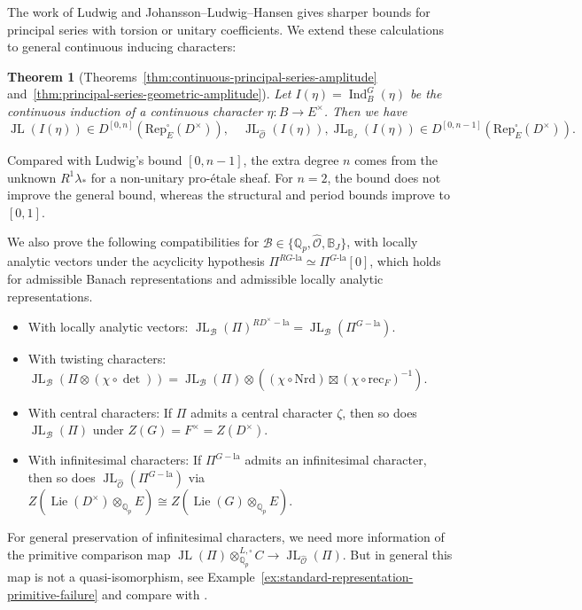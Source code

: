 \documentclass[11pt]{article}
\newtheorem{theorem}{Theorem}[section]
\theoremstyle{definition}
\newcommand{\la}{\mathrm{la}}
\newcommand{\Ind}{\operatorname{Ind}}
\newcommand{\JL}{\operatorname{JL}}
\newcommand{\Lie}{\operatorname{Lie}}
\begin{document}
The work of Ludwig \cite{Ludwig} and Johansson--Ludwig--Hansen
\cite{JLH} gives sharper bounds for principal series with
torsion or unitary coefficients.  We extend these calculations
to general continuous inducing characters:

\begin{theorem}[Theorems~\ref{thm:continuous-principal-series-amplitude}
and~\ref{thm:principal-series-geometric-amplitude}]
  Let $I(\eta)=\Ind_B^G(\eta)$ be the continuous induction of a continuous character $\eta\colon B\to E^\times$. Then we have 
  \[\JL(I(\eta))\in D^{[0, n]}(\mathrm{Rep}_E^{\square}(D^\times)), \quad
  \JL_{\widehat{\mathscr O}}(I(\eta)),
  \JL_{\mathbb B_J}(I(\eta))
  \in D^{[0,n-1]}(\mathrm{Rep}_E^\square(D^\times)).
  \]
\end{theorem}
Compared with Ludwig's bound $[0, n-1]$, the extra degree $n$ comes from the unknown $R^1\lambda_*$ for a non-unitary pro-\'etale sheaf. 
For \(n=2\), the bound does not improve the general bound,
whereas the structural and period bounds improve to \([0,1]\).

We also prove the following compatibilities for $\mathscr{B}\in\{\mathbb{Q}_p, \widehat{\mathscr O}, \mathbb{B}_J\}$, with locally analytic vectors under
the acyclicity hypothesis \(\Pi^{RG\text{-}\la}\simeq\Pi^{G\text{-}\la}[0]\), which holds for admissible
Banach representations and admissible locally analytic representations.
\begin{itemize}
      \item{With locally analytic vectors:}  $\JL_{\mathscr{B}}(\Pi)^{RD^\times-\mathrm{la}}=\JL_{\mathscr{B}}(\Pi^{G-\mathrm{la}})$.
      \item{With twisting characters:} $\JL_{\mathscr{B}}(\Pi\otimes(\chi\circ\det))=\JL_{\mathscr{B}}(\Pi)\otimes((\chi\circ\mathrm{Nrd})\boxtimes(\chi\circ\mathrm{rec}_F)^{-1})$.
      \item{With central characters:} If $\Pi$ admits a central character $\zeta$, then so does $\JL_{\mathscr{B}}(\Pi)$ under $Z(G)=F^\times=Z(D^\times)$.
      \item{With infinitesimal characters:} If $\Pi^{G-\la}$ admits an infinitesimal character, then so does $\JL_{\widehat{\mathscr{O}}}(\Pi^{G-\la})$ via $Z(\Lie(D^\times)\otimes_{\mathbb{Q}_p}E)\cong Z(\Lie(G)\otimes_{\mathbb{Q}_p}E)$.
\end{itemize}

For general preservation of infinitesimal characters, we need more information of the primitive comparison map $\JL(\Pi)\otimes^{L,\square}_{\mathbb{Q}_p}C\to\JL_{\widehat{\mathscr{O}}}(\Pi)$.
But in general this map is not a quasi-isomorphism, see Example~\ref{ex:standard-representation-primitive-failure} and compare with \cite[Example~1.1.2]{ALM}.
\end{document}
